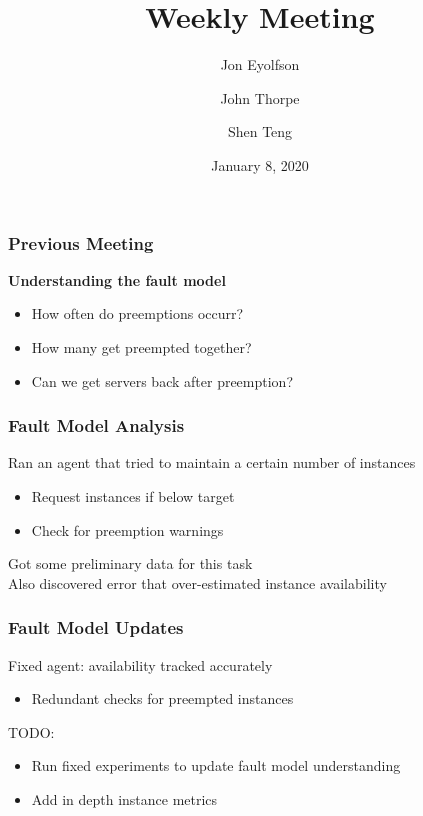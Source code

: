 
\title{Weekly Meeting}
\date{January 8, 2020}
\author{Jon Eyolfson \and John Thorpe \and Shen Teng}



  \begin{frame}[plain]
    \titlepage
  \end{frame}

  \setcounter{framenumber}{0}

  \begin{frame}
    \frametitle{Previous Meeting}
    \textbf{Understanding the fault model}
    \begin{itemize}
      \item How often do preemptions occurr?
      \item How many get preempted together?
      \item Can we get servers back after preemption?
    \end{itemize}

  \end{frame}

  \begin{frame}
    \frametitle{Fault Model Analysis}

    Ran an agent that tried to maintain a certain number of instances \\
    \begin{itemize}
      \item Request instances if below target
      \item Check for preemption warnings
    \end{itemize}

    \vspace{1em}
    Got some preliminary data for this task \\
    Also discovered error that over-estimated instance availability
  \end{frame}

  \begin{frame}
    \frametitle{Fault Model Updates}

    Fixed agent: availability tracked accurately
    \begin{itemize}
      \item Redundant checks for preempted instances
    \end{itemize}

    \vspace{1em}
    TODO:
    \begin{itemize}
      \item Run fixed experiments to update fault model understanding
      \item Add in depth instance metrics
    \end{itemize}
  \end{frame}

